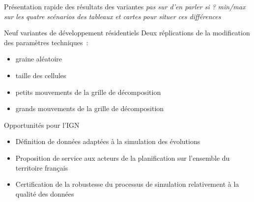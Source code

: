 \documentclass[xcolor=table]{beamer}
\newcommand\FontPetit{\fontsize{8}{6}\selectfont}
\begin{document}
\begin{frame}{Présentation rapide des résultats des variantes}
\textit{pas sur d'en parler si ?}
\textit{min/max sur les quatre scénarios des tableaux et cartes pour situer ces différences}
\begin{block}{Neuf variantes de développement résidentiels}
	\vspace{0.1cm}
	Deux réplications de la modification des paramètres techniques~:
	\begin{itemize}
		\item graine aléatoire
		\item taille des cellules
		\item petits mouvements de la grille de décomposition
		\item grands mouvements de la grille de décomposition
	\end{itemize}
\end{block}
\end{frame}



\begin{frame}{Opportunités pour l'IGN}
\begin{itemize}
	\item Définition de données adaptées à la simulation des évolutions
	\item Proposition de service aux acteurs de la planification sur l'ensemble du territoire français
	\item Certification de la robustesse du processus de simulation relativement à la qualité des données
\end{itemize}
\end{frame}
\end{document}
